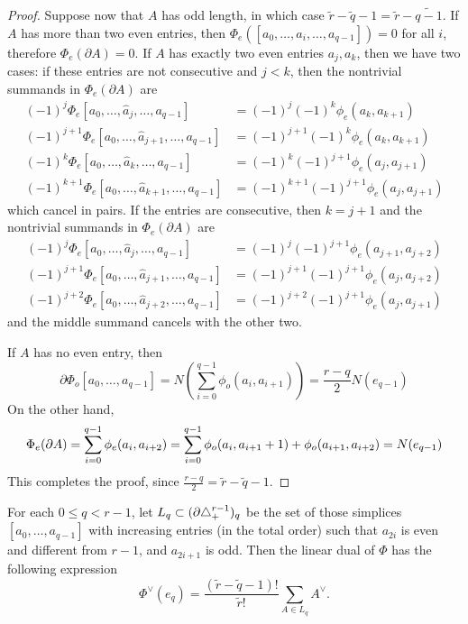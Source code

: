\begin{proof}
Suppose now that $A$ has odd length, in which case $\tilde{r}-\tilde{q}-1 = \tilde{r}-\widetilde{q-1} $. If $A$ has more than two even entries, then $\Phi_e([a_0,\ldots,\hat{a}_i,\ldots,a_{q-1}]) = 0$ for all $i$, therefore $\Phi_e(\partial A) = 0$. If $A$ has exactly two even entries $a_j,a_k$, then we have two cases: if these entries are not consecutive and $j<k$, then the nontrivial summands in $    \Phi_e(\partial A)$ are
\begin{align*}
 (-1)^j\Phi_e[a_0,\ldots,\hat{a}_j,\ldots,a_{q-1}] &= (-1)^j(-1)^{k}\phi_e(a_k,a_{k+1}) \\
  (-1)^{j+1}\Phi_e[a_0,\ldots,\hat{a}_{j+1},\ldots,a_{q-1}] &=  (-1)^{j+1}(-1)^{k}\phi_e(a_k,a_{k+1}) 
  \\
   (-1)^{k}\Phi_e[a_0,\ldots,\hat{a}_k,\ldots,a_{q-1}] &= (-1)^k(-1)^{j+1}\phi_e(a_j,a_{j+1}) \\
    (-1)^{k+1}\Phi_e[a_0,\ldots,\hat{a}_{k+1},\ldots,a_{q-1}] &= (-1)^{k+1}(-1)^{j+1}\phi_e(a_j,a_{j+1})
\end{align*}
which cancel in pairs. If the entries are consecutive, then $k=j+1$ and the nontrivial summands in $\Phi_e(\partial A)$ are
\begin{align*}
 (-1)^j\Phi_e[a_0,\ldots,\hat{a}_j,\ldots,a_{q-1}] &=  (-1)^{j}(-1)^{j+1}\phi_e(a_{j+1},a_{j+2}) \\
  (-1)^{j+1}\Phi_e[a_0,\ldots,\hat{a}_{j+1},\ldots,a_{q-1}] &= (-1)^{j+1}(-1)^{j+1}\phi_e(a_j,a_{j+2}) \\
   (-1)^{j+2}\Phi_e[a_0,\ldots,\hat{a}_{j+2},\ldots,a_{q-1}] &=  (-1)^{j+2}(-1)^{j+1}\phi_e(a_j,a_{j+1}) 
\end{align*}
and the middle summand cancels with the other two.

If $A$ has no even entry, then
\[
    \partial \Phi_o[a_0,\ldots,a_{q-1}] = N\left(\sum_{i=0}^{q-1} \phi_o(a_i,a_{i+1})\right) = \frac{r-q}{2}N(e_{q-1})
\]
On the other hand,
\[
    \Phi_e(\partial A)
    = \sum_{i=0}^{q-1} \phi_e(a_i,a_{i+2}) \\
    = \sum_{i=0}^{q-1} \phi_o(a_{i},a_{i+1}+1) + \phi_o(a_{i+1},a_{i+2}) \\
    = N(e_{q-1})
\]
This completes the proof, since $\frac{r-q}{2} = \tilde{r}-\tilde{q}-1$.
\end{proof}


\begin{remark}
	For each $0\leq q<r-1$, let $L_q\subset (\partial \triangle_{+}^{r-1})_q$ be the set of those simplices $[a_0,\ldots, a_{q-1}]$ with increasing entries (in the total order) such that $a_{2i}$ is even and different from $r-1$, and $a_{2i+1}$ is odd. Then the linear dual of $\Phi$ has the following expression
	\begin{equation}\label{eq:111}
		\Phi^\vee(e_{q}) = \frac{(\tilde{r}-\tilde{q}-1)!}{\tilde{r}!}\sum_{A\in L_q} A^\vee.
	\end{equation}
\end{remark}